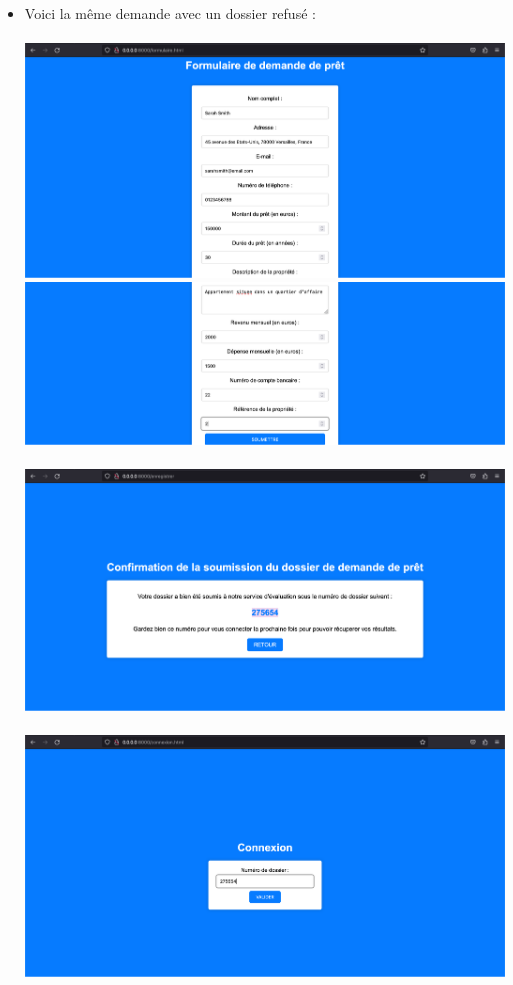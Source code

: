 \documentclass{article}
\begin{document}
\begin{itemize}
	   \item Voici la même demande avec un dossier refusé : \\
	   \\
	   \includegraphics[width=\textwidth]{images/formulairera.png} \\
	   \includegraphics[width=\textwidth]{images/formulairerb.png} \\
	   \\
	   \includegraphics[width=\textwidth]{images/depotr.png} \\
	   \\
	   \includegraphics[width=\textwidth]{images/connexionr.png} \\

\end{itemize}
\end{document}
